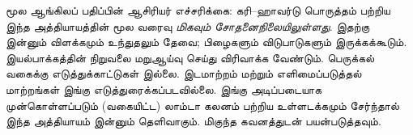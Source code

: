 \documentclass[../../../include/open-logic-chapter]{subfiles}
\begin{document}

\begin{editorial}
  மூல ஆங்கிலப் பதிப்பின் ஆசிரியர் எச்சரிக்கை: கரி--ஹாவர்டு
  பொருத்தம் பற்றிய இந்த அத்தியாயத்தின் மூல வரைவு
  \emph{மிகவும் சோதனைநிலையிலுள்ளது}. இதற்கு இன்னும்
  விளக்கமும் உந்துதலும் தேவை; பிழைகளும் விடுபாடுகளும்
  இருக்கக்கூடும். இயல்பாக்கத்தின் நிறுவலை மறுஆய்வு
  செய்து விரிவாக்க வேண்டும். பெருக்கல் வகைக்கு
  எடுத்துக்காட்டுகள் இல்லை. இடமாற்றம் மற்றும்
  எளிமைப்படுத்தல் மாற்றங்கள் இங்கு எடுத்துரைக்கப்படவில்லை.
  இங்கு அடிப்படையாக முன்கொள்ளப்படும் (வகையிட்ட)
  லாம்டா கலனம் பற்றிய உள்ளடக்கமும் சேர்ந்தால் இந்த
  அத்தியாயம் இன்னும் தெளிவாகும். மிகுந்த கவனத்துடன்
  பயன்படுத்தவும்.
\end{editorial}


\OLEndChapterHook
\end{document}

